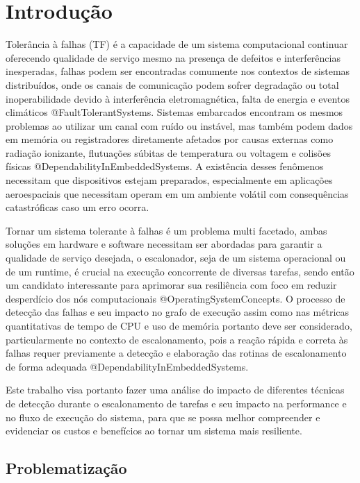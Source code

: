\chapter{Introdução}
\label{cap:intro}

Tolerância à falhas (TF) é a capacidade de um sistema computacional continuar oferecendo qualidade de serviço mesmo na presença de defeitos e interferências inesperadas, falhas podem ser encontradas comumente nos contextos de sistemas distribuídos, onde os canais de comunicação podem sofrer degradação ou total inoperabilidade devido à interferência eletromagnética, falta de energia e eventos climáticos @FaultTolerantSystems. Sistemas embarcados encontram os mesmos problemas ao utilizar um canal com ruído ou instável, mas também podem dados em memória ou registradores diretamente afetados por causas externas como radiação ionizante, flutuações súbitas de temperatura ou voltagem e colisões físicas @DependabilityInEmbeddedSystems. A existência desses fenômenos necessitam que dispositivos estejam preparados, especialmente em aplicações aeroespaciais que necessitam operam em um ambiente volátil com consequências catastróficas caso um erro ocorra.

Tornar um sistema tolerante à falhas é um problema multi facetado, ambas soluções em hardware e software necessitam ser abordadas para garantir a qualidade de serviço desejada, o escalonador, seja de um sistema operacional ou de um runtime, é crucial na execução concorrente de diversas tarefas, sendo então um candidato interessante para aprimorar sua resiliência com foco em reduzir desperdício dos nós computacionais @OperatingSystemConcepts. O processo de detecção das falhas e seu impacto no grafo de execução assim como nas métricas quantitativas de tempo de CPU e uso de memória portanto deve ser considerado, particularmente no contexto de escalonamento, pois a reação rápida e correta às falhas requer previamente a detecção e elaboração das rotinas de escalonamento de forma adequada @DependabilityInEmbeddedSystems.

Este trabalho visa portanto fazer uma análise do impacto de diferentes técnicas de detecção durante o escalonamento de tarefas e seu impacto na performance e no fluxo de execução do sistema, para que se possa melhor compreender e evidenciar os custos e benefícios ao tornar um sistema mais resiliente. 

\section{Problematização}

